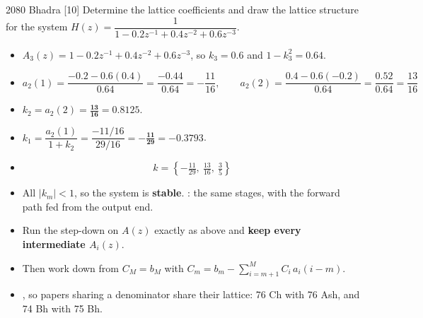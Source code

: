 \begin{asked}{2080 Bhadra \textperiodcentered{} [10]}
Determine the lattice coefficients and draw the lattice structure for the system
$H(z)=\dfrac{1}{1-0.2z^{-1}+0.4z^{-2}+0.6z^{-3}}$.
\end{asked}

\begin{itemize}
  \item $A_3(z)=1-0.2z^{-1}+0.4z^{-2}+0.6z^{-3}$, so $k_3=\mathbf{0.6}$ and
        $1-k_3^{2}=0.64$.
  \item[] \[ a_2(1)=\frac{-0.2-0.6(0.4)}{0.64}=\frac{-0.44}{0.64}=-\frac{11}{16},\qquad
             a_2(2)=\frac{0.4-0.6(-0.2)}{0.64}=\frac{0.52}{0.64}=\frac{13}{16} \]
  \item $k_2=a_2(2)=\mathbf{\tfrac{13}{16}}=0.8125$.
  \item $k_1=\dfrac{a_2(1)}{1+k_2}=\dfrac{-11/16}{29/16}=\mathbf{-\tfrac{11}{29}}
        =-0.3793$.
  \item[] \[ \boxed{k=\left\{-\tfrac{11}{29},\ \tfrac{13}{16},\ \tfrac35\right\}} \]
  \item All $|k_m|<1$, so the system is \textbf{stable}. : the same stages, with the forward path fed from
        the output end.
\end{itemize}

\begin{itemize}
  \item Run the step-down on $A(z)$ exactly as above and \textbf{keep every intermediate
        $A_i(z)$}.
  \item Then work down from $C_M=b_M$ with
        $C_m=b_m-\sum_{i=m+1}^{M}C_i\,a_i(i-m)$.
  \item {}, so papers sharing a denominator
        share their lattice: 76 Ch with 76 Ash, and 74 Bh with 75 Bh.
\end{itemize}

